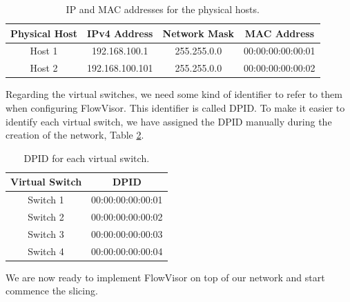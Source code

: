 \begin{table}
    \centering
    \caption{IP and MAC addresses for the physical hosts.}
    \vspace{0.1 cm}
    \begin{tabular}{c c c c}
    \hline
    \rowcolor{lightgray}
    \textbf{Physical Host}              &\textbf{IPv4 Address}     &\textbf{Network Mask}   &\textbf{MAC Address}     \\ \hline
    Host 1                              &  192.168.100.1           & 255.255.0.0            & 00:00:00:00:00:01       \\ \hline 
    Host 2                              &  192.168.100.101         & 255.255.0.0            & 00:00:00:00:00:02       \\ \hline 
    \end{tabular}
    \label{tab:IP_external_hosts}
\end{table}

Regarding the virtual switches, we need some kind of identifier to refer to them when configuring FlowVisor. This identifier is called DPID. To make it easier to identify each virtual switch, we have assigned the DPID manually during the creation of the network, Table \ref{tab:DPID_assignment}.

\begin{table}
    \centering
    \caption{DPID for each virtual switch.}
    \vspace{0.1 cm}
    \begin{tabular}{c c}
    \hline
    \rowcolor{lightgray}
    \textbf{Virtual Switch}              &\textbf{DPID}            \\ \hline
    Switch 1                             & 00:00:00:00:00:01       \\ \hline 
    Switch 2                             & 00:00:00:00:00:02       \\ \hline 
    Switch 3                             & 00:00:00:00:00:03       \\ \hline 
    Switch 4                             & 00:00:00:00:00:04       \\ \hline 
    \end{tabular}
    \label{tab:DPID_assignment}
\end{table}

We are now ready to implement FlowVisor on top of our network and start commence the slicing.